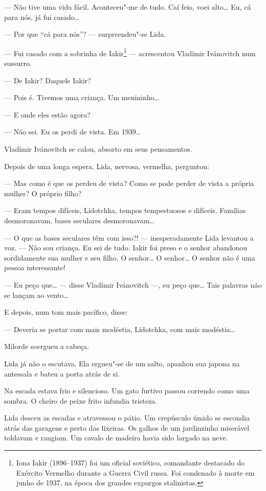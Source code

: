 --- Não tive uma vida fácil. Aconteceu"-me de tudo. Caí feio, voei
alto\ldots{} Eu, cá para nós, já fui casado\ldots{}

--- Por que ``cá para nós''? --- surpreendeu"-se Lida.

--- Fui casado com a sobrinha de Iakir\footnote{Iona Iakir (1896--1937)
  foi um oficial soviético, comandante destacado do Exército Vermelho
  durante a Guerra Civil russa. Foi condenado à morte em junho de 1937,
  na época dos grandes expurgos stalinistas.} --- acrescentou Vladímir
Ivánovitch num sussurro.

--- De Iakir? Daquele Iakir?

--- Pois é. Tivemos uma criança. Um menininho\ldots{}

--- E onde eles estão agora?

--- Não sei. Eu os perdi de vista. Em 1939\ldots{}

Vladímir Ivánovitch se calou, absorto em seus pensamentos.

Depois de uma longa espera, Lida, nervosa, vermelha, perguntou:

--- Mas como é que os perdeu de vista? Como se pode perder de vista a
própria mulher? O próprio filho?

--- Eram tempos difíceis, Lídotchka, tempos tempestuosos e difíceis.
Famílias desmoronavam, bases seculares desmoronavam\ldots{}

--- O que as bases seculares têm com isso?! --- inesperadamente Lida
levantou a voz. --- Não sou criança. Eu sei de tudo. Iakir foi preso e o
senhor abandonou sordidamente sua mulher e seu filho. O senhor\ldots{} O
senhor\ldots{} O senhor não é uma pessoa interessante!

--- Eu peço que\ldots{} --- disse Vladímir Ivánovitch ---, eu peço que\ldots{}
Tais palavras não se lançam ao vento\ldots{}

E depois, num tom mais pacífico, disse:

--- Deveria se portar com mais modéstia, Lídotchka, com mais modéstia\ldots{}

Milorde soergueu a cabeça.

Lida já não o escutava. Ela ergueu"-se de um salto, apanhou sua japona na
antessala e bateu a porta atrás de si.

Na escada estava frio e silencioso. Um gato furtivo passou correndo como
uma sombra. O cheiro de peixe frito infundia tristeza.

Lida desceu as escadas e atravessou o pátio. Um crepúsculo úmido se
escondia atrás das garagens e perto das lixeiras. Os galhos de um
jardinzinho miserável toldavam e rangiam. Um cavalo de madeira havia
sido largado na neve.

